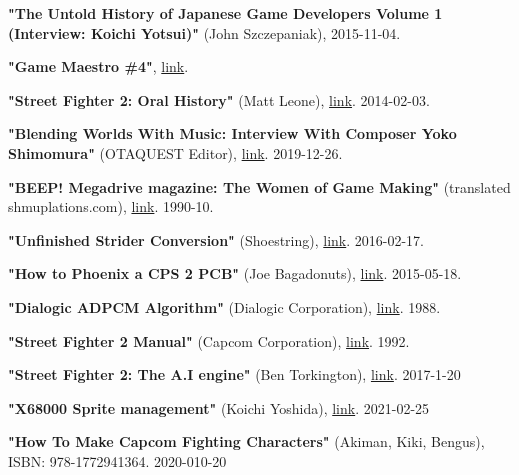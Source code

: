 \begin{thebibliography}{999}
  
  \textbf{"The Untold History of Japanese Game Developers Volume 1 (Interview: Koichi Yotsui)"} (John Szczepaniak),
  2015-11-04.

  \textbf{"Game Maestro \#4"}, \href{http://shmuplations.com/akiman/}{link}.

  \textbf{"Street Fighter 2: Oral History"} (Matt Leone),
  \href{https://www.polygon.com/a/street-fighter-2-oral-history/}{link}.
  2014-02-03.

  \textbf{"Blending Worlds With Music: Interview With Composer Yoko Shimomura"} (OTAQUEST Editor),
  \href{https://www.otaquest.com/yoko-shimomura-interview/}{link}.
  2019-12-26.
  
  \textbf{"BEEP! Megadrive magazine: The Women of Game Making"} (translated shmuplations.com),
  \href{https://shmuplations.com/womenofgamedesign/}{link}.
  1990-10.

  \textbf{"Unfinished Strider Conversion"} (Shoestring),
  \href{https://www.jammarcade.net/strider-conversion/}{link}.
  2016-02-17.

  \textbf{"How to Phoenix a CPS 2 PCB"} (Joe Bagadonuts),
  \href{https://www.youtube.com/watch?v=HFj8Mkw_kog}{link}.
  2015-05-18.

  \textbf{"Dialogic ADPCM Algorithm"} (Dialogic Corporation),
  \href{https://multimedia.cx/mirror/dialogic-adpcm.pdf}{link}.
  1988.



  \textbf{"Street Fighter 2 Manual"} (Capcom Corporation),
  \href{https://www.gamesdatabase.org/Media/SYSTEM/Arcade/Manual/formated/Street_Fighter_II--_Champion_Edition_-_1992_-_Capcom.pdf}{link}.
  1992.

  \textbf{"Street Fighter 2: The A.I engine"} (Ben Torkington),
  \href{https://sf2platinum.wordpress.com/2017/01/20/the-ai-engine}{link}.
  2017-1-20

  \textbf{"X68000 Sprite management"} (Koichi Yoshida),
  \href{https://yosshin4004-github-io.translate.goog/x68k/xsp/index.html?_x_tr_sl=ja&_x_tr_tl=en&_x_tr_hl=en-US}{link}.
  2021-02-25

  \textbf{"How To Make Capcom Fighting Characters"} (Akiman, Kiki, Bengus),
  ISBN: 978-1772941364.
  2020-010-20


\end{thebibliography}
